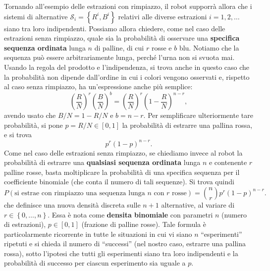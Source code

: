 \documentclass[
  italian,
  letterpaper,
]{book}
\newcommand{\bra}[1]{\left( #1 \right)}
\newcommand{\cur}[1]{\left\{ #1 \right\}}
\theoremstyle{definition}
\theoremstyle{remark}
\begin{document}
Tornando all'esempio delle estrazioni con rimpiazzo, il robot supporrà
allora che i sistemi di alternative \(\mathcal{S}_i = \cur{R^i, B^i}\)
relativi alle diverse estrazioni \(i=1, 2, \ldots\) siano tra loro
indipendenti. Possiamo allora chiedere, come nel caso delle estrazioni
senza rimpiazzo, quale sia la probabilità di osservare una
\textbf{specifica sequenza ordinata} lunga \(n\) di palline, di cui
\(r\) rosse e \(b\) blu. Notiamo che la sequenza può essere
arbitrariamente lunga, perché l'urna non si svuota mai. Usando la regola
del prodotto e l'indipendenza, si trova anche in questo caso che la
probabilità non dipende dall'ordine in cui i colori vengono osservati e,
rispetto al caso senza rimpiazzo, ha un'espressione anche più semplice:
\[ \bra{\frac{R}N}^r \bra{ \frac B N}^b = \bra{\frac{R}N}^r \bra{ 1- \frac R N}^{n-r},\]
avendo usato che \(B/N = 1-R/N\) e \(b = n-r\). Per semplificare
ulteriormente tare probabilità, si pone \(p = R/N \in [0,1]\) la
probabilità di estrarre una pallina rossa, e si trova
\[ p^r (1-p)^{n-r}.\] Come nel caso delle estrazioni senza rimpiazzo, se
chiediamo invece al robot la probabilità di estrarre una
\textbf{qualsiasi sequenza ordinata} lunga \(n\) e contenente \(r\)
palline rosse, basta moltiplicare la probabilità di una specifica
sequenza per il coefficiente binomiale (che conta il numero di tali
sequenze). Si trova quindi
\[ P( \text{si estrae con rimpiazzo una sequenza lunga $n$ con $r$ rosse} ) = {n \choose r} p^r (1-p)^{n-r}.\]
che definisce una nuova densità discreta sulle \(n+1\) alternative, al
variare di \(r \in \cur{0, \ldots, n}\). Essa è nota come
\textbf{densita binomiale} con parametri \(n\) (numero di estrazioni),
\(p \in [0,1]\) (frazione di palline rosse). Tale formula è
particolarmente ricorrente in tutte le situazioni in cui vi siano \(n\)
``esperimenti'' ripetuti e si chieda il numero di ``successi'' (nel
nostro caso, estrarre una pallina rossa), sotto l'ipotesi che tutti gli
esperimenti siano tra loro indipendenti e la probabilità di successo per
ciascun esperimento sia uguale a \(p\).
\end{document}
